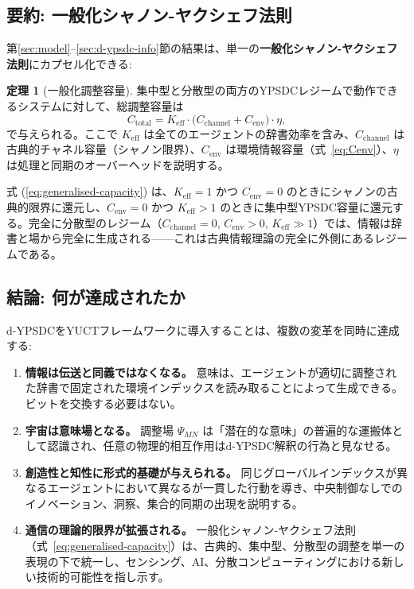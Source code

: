 \documentclass[12pt,a4paper]{article}
\theoremstyle{definition}
\newtheorem{theorem}{定理}[section]
\theoremstyle{remark}
\begin{document}
	\subsection{要約: 一般化シャノン-ヤクシェフ法則}
	\label{subsec:generalised-law}
	
	第\ref{sec:model}--\ref{sec:d-ypsdc-info}節の結果は、単一の\textbf{一般化シャノン-ヤクシェフ法則}にカプセル化できる:
	
	\begin{theorem}[一般化調整容量]
		集中型と分散型の両方のYPSDCレジームで動作できるシステムに対して、総調整容量は
		\begin{equation}
			\boxed{C_{\mathrm{total}} = K_{\mathrm{eff}} \cdot \bigl(
				C_{\mathrm{channel}} + C_{\mathrm{env}} \bigr) \cdot \eta},
			\label{eq:generalised-capacity}
		\end{equation}
		で与えられる。ここで $K_{\mathrm{eff}}$ は全てのエージェントの辞書効率を含み、$C_{\mathrm{channel}}$ は古典的チャネル容量（シャノン限界）、$C_{\mathrm{env}}$ は環境情報容量（式~\eqref{eq:Cenv}）、$\eta$ は処理と同期のオーバーヘッドを説明する。
	\end{theorem}
	
	式 (\ref{eq:generalised-capacity}) は、$K_{\mathrm{eff}}=1$ かつ $C_{\mathrm{env}}=0$ のときにシャノンの古典的限界に還元し、$C_{\mathrm{env}}=0$ かつ $K_{\mathrm{eff}}>1$ のときに集中型YPSDC容量に還元する。完全に分散型のレジーム（$C_{\mathrm{channel}}=0$, $C_{\mathrm{env}}>0$, $K_{\mathrm{eff}}\gg1$）では、情報は辞書と場から完全に生成される——これは古典情報理論の完全に外側にあるレジームである。
	
	\subsection{結論: 何が達成されたか}
	\label{subsec:conclusions-dypsdc}
	
	d-YPSDCをYUCTフレームワークに導入することは、複数の変革を同時に達成する:
	
	\begin{enumerate}[leftmargin=*]
		\item \textbf{情報は伝送と同義ではなくなる。}
		意味は、エージェントが適切に調整された辞書で固定された環境インデックスを読み取ることによって生成できる。ビットを交換する必要はない。
		\item \textbf{宇宙は意味場となる。}
		調整場 $\Psi_{MN}$ は「潜在的な意味」の普遍的な運搬体として認識され、任意の物理的相互作用はd-YPSDC解釈の行為と見なせる。
		\item \textbf{創造性と知性に形式的基礎が与えられる。}
		同じグローバルインデックスが異なるエージェントにおいて異なるが一貫した行動を導き、中央制御なしでのイノベーション、洞察、集合的同期の出現を説明する。
		\item \textbf{通信の理論的限界が拡張される。}
		一般化シャノン-ヤクシェフ法則（式~\ref{eq:generalised-capacity}）は、古典的、集中型、分散型の調整を単一の表現の下で統一し、センシング、AI、分散コンピューティングにおける新しい技術的可能性を指し示す。
	\end{enumerate}
	
\end{document}
